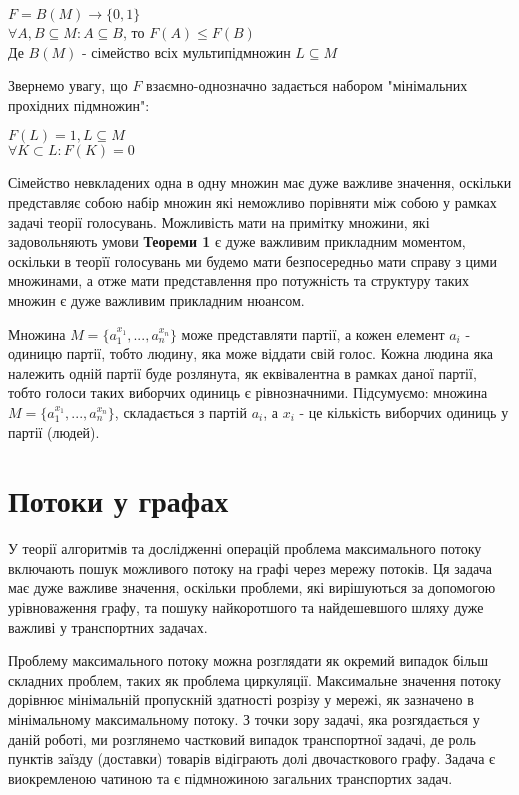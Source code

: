\begin{center}
$F = B(M) \rightarrow \{0,1\}$
\\
$ \forall A, B \subseteq M: A \subseteq B$, то $F(A) \leq F(B)$ 
\\
Де $B(M)$ - сімейство всіх мультипідмножин $L \subseteq M$
\end{center}

Звернемо увагу, що $F$ взаємно-однозначно задається набором "мінімальних прохідних підмножин":

\begin{center}
$F(L) = 1, L \subseteq M $
\\
$ \forall K \subset L: F(K) = 0$ 
\end{center}

Сімейство невкладених одна в одну множин має дуже важливе значення, оскільки представляє собою набір множин які неможливо порівняти між собою у рамках задачі теорії голосувань. Можливість мати на примітку множини, які задовольняють умови {\bf Теореми 1} є дуже важливим прикладним моментом, оскільки в теорїї голосувань ми будемо мати безпосередньо мати справу з цими множинами, а отже мати представлення про потужність та структуру таких множин є дуже важливим прикладним нюансом.

Множина $M = \{a_1^{x_1}, ... , a_n^{x_n}\}$ може представляти партії, а кожен елемент $a_i$ - одиницю партії, тобто людину, яка може віддати свій голос. Кожна людина яка належить одній партії буде розлянута, як еквівалентна в рамках даної партії, тобто голоси таких виборчих одиниць є рівнозначними. Підсумуємо: множина $M = \{a_1^{x_1}, ... , a_n^{x_n}\}$, складається з партій $a_i$, а $x_i$ - це кількість виборчих одиниць у партії (людей).


\section{Потоки у графах}

У теорії алгоритмів та дослідженні операцій проблема максимального потоку включають пошук можливого потоку на графі через мережу потоків. Ця задача має дуже важливе значення, оскільки проблеми, які вирішуються за допомогою урівноваження графу, та пошуку найкоротшого та найдешевшого шляху дуже важливі у транспортних задачах.

Проблему максимального потоку можна розглядати як окремий випадок більш складних проблем, таких як проблема циркуляції. Максимальне значення потоку дорівнює мінімальній пропускній здатності розрізу у мережі, як зазначено в мінімальному максимальному потоку. З точки зору задачі, яка розгядається у даній роботі, ми розглянемо частковий випадок транспортної задачі, де роль пунктів  заїзду (доставки) товарів відіграють долі двочасткового графу. Задача є виокремленою чатиною та є підмножиною загальних транспортих задач.


